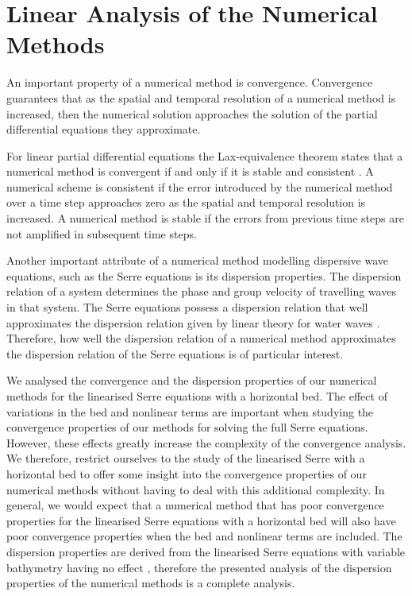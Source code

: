 \chapter{Linear Analysis of the Numerical Methods}
\label{chp:AnalNumMethod}
An important property of a numerical method is convergence. Convergence guarantees that as the spatial and temporal resolution of a numerical method is increased, then the numerical solution approaches the solution of the partial differential equations they approximate. 

For linear partial differential equations the Lax-equivalence theorem states that a numerical method is convergent if and only if it is stable and consistent \cite{Lax-Richtmyer-1956-267}. A numerical scheme is consistent if the error introduced by the numerical method over a time step approaches zero as the spatial and temporal resolution is increased. A numerical method is stable if the errors from previous time steps are not amplified in subsequent time steps.

Another important attribute of a numerical method modelling dispersive wave equations, such as the Serre equations is its dispersion properties. The dispersion relation of a system determines the phase and group velocity of travelling waves in that system. The Serre equations possess a dispersion relation that well approximates the dispersion relation given by linear theory for water waves \cite{Barthelemy-2004-315}. Therefore, how well the dispersion relation of a numerical method approximates the dispersion relation of the Serre equations is of particular interest.

We analysed the convergence and the dispersion properties of our numerical methods for the linearised Serre equations with a horizontal bed. The effect of variations in the bed and nonlinear terms are important when studying the convergence properties of our methods for solving the full Serre equations. However, these effects greatly increase the complexity of the convergence analysis. We therefore, restrict ourselves to the study of the linearised Serre with a horizontal bed to offer some insight into the convergence properties of our numerical methods without having to deal with this additional complexity. In general, we would expect that a numerical method that has poor convergence properties for the linearised Serre equations with a horizontal bed will also have poor convergence properties when the bed and nonlinear terms are included. The dispersion properties are derived from the linearised Serre equations with variable bathymetry having no effect \cite{Zoppou-etal-2017}, therefore the presented analysis of the dispersion properties of the numerical methods is a complete analysis.


